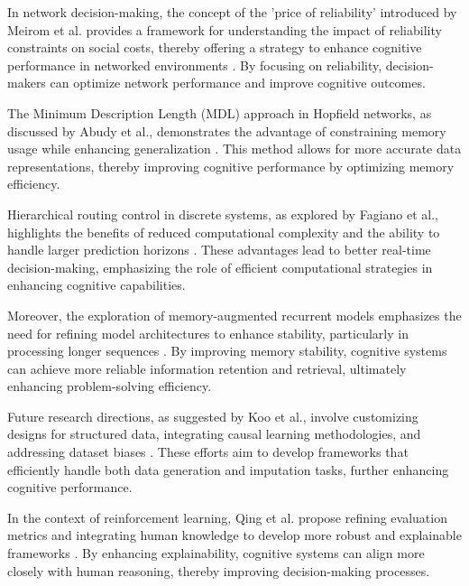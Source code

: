 In network decision-making, the concept of the 'price of reliability' introduced by Meirom et al. provides a framework for understanding the impact of reliability constraints on social costs, thereby offering a strategy to enhance cognitive performance in networked environments \cite{meirom2016strategicformationheterogeneousnetworks}. By focusing on reliability, decision-makers can optimize network performance and improve cognitive outcomes.



The Minimum Description Length (MDL) approach in Hopfield networks, as discussed by Abudy et al., demonstrates the advantage of constraining memory usage while enhancing generalization \cite{abudy2023minimumdescriptionlengthhopfield}. This method allows for more accurate data representations, thereby improving cognitive performance by optimizing memory efficiency.



Hierarchical routing control in discrete systems, as explored by Fagiano et al., highlights the benefits of reduced computational complexity and the ability to handle larger prediction horizons \cite{fagiano2020hierarchicalroutingcontroldiscrete}. These advantages lead to better real-time decision-making, emphasizing the role of efficient computational strategies in enhancing cognitive capabilities.



Moreover, the exploration of memory-augmented recurrent models emphasizes the need for refining model architectures to enhance stability, particularly in processing longer sequences \cite{das2024exploringlearnabilitymemoryaugmentedrecurrent}. By improving memory stability, cognitive systems can achieve more reliable information retention and retrieval, ultimately enhancing problem-solving efficiency.



Future research directions, as suggested by Koo et al., involve customizing designs for structured data, integrating causal learning methodologies, and addressing dataset biases \cite{koo2023comprehensivesurveygenerativediffusion}. These efforts aim to develop frameworks that efficiently handle both data generation and imputation tasks, further enhancing cognitive performance.



In the context of reinforcement learning, Qing et al. propose refining evaluation metrics and integrating human knowledge to develop more robust and explainable frameworks \cite{qing2023surveyexplainablereinforcementlearning}. By enhancing explainability, cognitive systems can align more closely with human reasoning, thereby improving decision-making processes.



